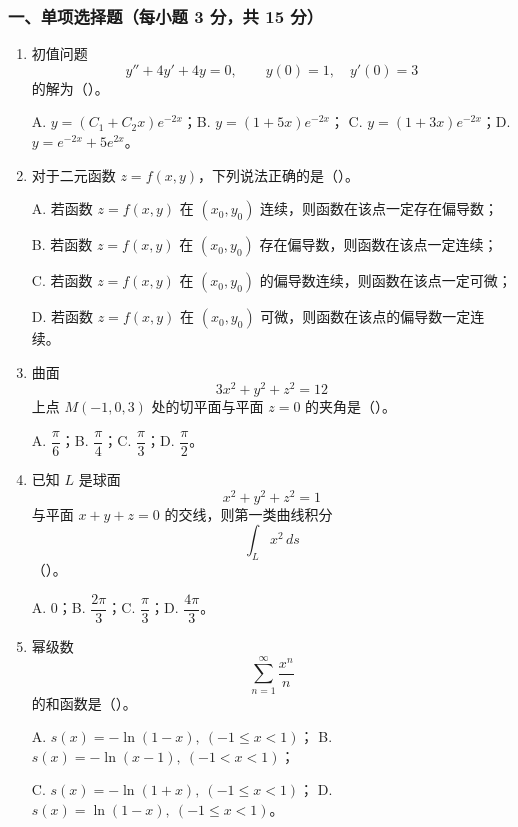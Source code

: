 \subsubsection*{一、单项选择题（每小题 3 分，共 15 分）}
\begin{enumerate}
  \item 初值问题
  \[
  y''+4y'+4y=0,\qquad y(0)=1,\quad y'(0)=3
  \]
  的解为（\quad）。

  A. $y=(C_1+C_2x)e^{-2x}$；\quad B. $y=(1+5x)e^{-2x}$；\quad
  C. $y=(1+3x)e^{-2x}$；\quad D. $y=e^{-2x}+5e^{2x}$。

  \item 对于二元函数 $z=f(x,y)$，下列说法正确的是（\quad）。

  A. 若函数 $z=f(x,y)$ 在 $(x_0,y_0)$ 连续，则函数在该点一定存在偏导数；

  B. 若函数 $z=f(x,y)$ 在 $(x_0,y_0)$ 存在偏导数，则函数在该点一定连续；

  C. 若函数 $z=f(x,y)$ 在 $(x_0,y_0)$ 的偏导数连续，则函数在该点一定可微；

  D. 若函数 $z=f(x,y)$ 在 $(x_0,y_0)$ 可微，则函数在该点的偏导数一定连续。

  \item 曲面
  \[
  3x^2+y^2+z^2=12
  \]
  上点 $M(-1,0,3)$ 处的切平面与平面 $z=0$ 的夹角是（\quad）。

  A. $\dfrac{\pi}{6}$；\quad B. $\dfrac{\pi}{4}$；\quad C. $\dfrac{\pi}{3}$；\quad D. $\dfrac{\pi}{2}$。

  \item 已知 $L$ 是球面
  \[
  x^2+y^2+z^2=1
  \]
  与平面 $x+y+z=0$ 的交线，则第一类曲线积分
  \[
  \int_Lx^2\,ds
  \]
  （\quad）。

  A. $0$；\quad B. $\dfrac{2\pi}{3}$；\quad C. $\dfrac{\pi}{3}$；\quad D. $\dfrac{4\pi}{3}$。

  \item 幂级数
  \[
  \sum_{n=1}^{\infty}\frac{x^n}{n}
  \]
  的和函数是（\quad）。

  A. $s(x)=-\ln(1-x),\ (-1\le x<1)$；\quad
  B. $s(x)=-\ln(x-1),\ (-1<x<1)$；

  C. $s(x)=-\ln(1+x),\ (-1\le x<1)$；\quad
  D. $s(x)=\ln(1-x),\ (-1\le x<1)$。
\end{enumerate}

